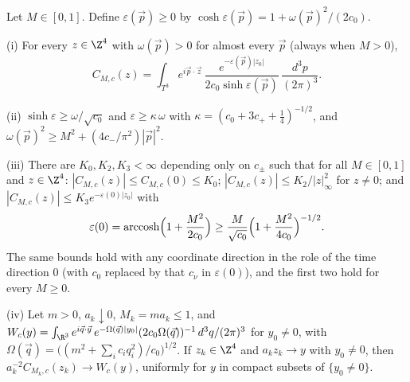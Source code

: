 \begin{lemma}\label{rN5:green}
Let $M\in[0,1]$. Define $\varepsilon(\vec p)\ge0$ by $\cosh\varepsilon(\vec
p)=1+\omega(\vec p)^2/(2c_0)$.

\textup{(i)} For every $z\in\Z^4$ with $\omega(\vec p)>0$ for almost every
$\vec p$ \textup{(}always when $M>0$\textup{)},
\begin{equation}\label{rN5:eq:3d}
C_{M,c}(z)=\int_{T^3}e^{i\vec p\cdot\vec z}\,\frac{e^{-\varepsilon(\vec
p)|z_0|}}{2c_0\sinh\varepsilon(\vec p)}\,\frac{d^3p}{(2\pi)^3}.
\end{equation}

\textup{(ii)} $\sinh\varepsilon\ge\omega/\sqrt{c_0}$ and $\varepsilon\ge
\kappa\,\omega$ with $\kappa=(c_0+3c_++\tfrac14)^{-1/2}$, and $\omega(\vec
p)^2\ge M^2+(4c_-/\pi^2)|\vec p|^2$.

\textup{(iii)} There are $K_0,K_2,K_3<\infty$ depending only on $c_\pm$
such that for all $M\in[0,1]$ and $z\in\Z^4$: $|C_{M,c}(z)|\le C_{M,c}(0)\le
K_0$; $|C_{M,c}(z)|\le K_2/|z|_\infty^2$ for $z\ne0$; and
$|C_{M,c}(z)|\le K_3e^{-\varepsilon(0)|z_0|}$ with
\[
\varepsilon(0)=\operatorname{arccosh}\Bigl(1+\frac{M^2}{2c_0}\Bigr)\ge\frac
M{\sqrt{c_0}}\Bigl(1+\frac{M^2}{4c_0}\Bigr)^{-1/2} .
\]
The same bounds hold with any coordinate direction in the role of the time
direction $0$ \textup{(}with $c_0$ replaced by that $c_\nu$ in
$\varepsilon(0)$\textup{)}, and the first two hold for every $M\ge0$.

\textup{(iv)} Let $m>0$, $a_k\downarrow0$, $M_k=ma_k\le1$, and $W_c(y)=
\int_{\R^3}e^{i\vec q\cdot\vec y}\,e^{-\Omega(\vec q)|y_0|}(2c_0\Omega(\vec
q))^{-1}\,d^3q/(2\pi)^3$ for $y_0\ne0$, with $\Omega(\vec q)=\bigl((m^2+
\sum_ic_iq_i^2)/c_0\bigr)^{1/2}$. If $z_k\in\Z^4$ and $a_kz_k\to y$ with
$y_0\ne0$, then $a_k^{-2}C_{M_k,c}(z_k)\to W_c(y)$, uniformly for $y$ in
compact subsets of $\{y_0\ne0\}$.
\end{lemma}

